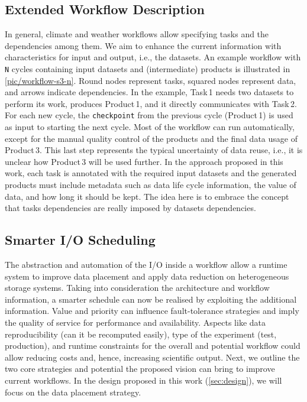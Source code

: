 \documentclass{superfri}
\begin{document}
\subsection{Extended Workflow Description}

In general, climate and weather workflows allow specifying tasks and the dependencies among them.
We aim to enhance the current information with characteristics for input and output, i.e., the datasets.
An example workflow with \texttt{N} cycles containing input datasets and (intermediate) products is illustrated in \cref{pic/workflow-s3-n}.
Round nodes represent tasks, squared nodes represent data, and arrows indicate dependencies.
In the example, Task\,1 needs two datasets to perform its work, produces Product\,1, and it directly communicates with Task\,2.
For each new cycle, the \texttt{checkpoint} from the previous cycle (Product\,1) is used as input to starting the next cycle.
Most of the workflow can run automatically, except for the manual quality control of the products and the final data usage of Product\,3.
This last step represents the typical uncertainty of data reuse, i.e., it is unclear how Product\,3 will be used further.
In the approach proposed in this work, each task is annotated with the required input datasets and the generated products must include metadata such as data life cycle information, the value of data, and how long it should be kept.
The idea here is to embrace the concept that tasks dependencies are really imposed by datasets dependencies.


\subsection{Smarter I/O Scheduling}

The abstraction and automation of the I/O inside a workflow allow a runtime system to improve data placement and apply data reduction on heterogeneous storage systems.
Taking into consideration the architecture and workflow information, a smarter schedule can now be realised by exploiting the additional information.
Value and priority can influence fault-tolerance strategies and imply the quality of service for performance and availability.
Aspects like data reproducibility (can it be recomputed easily), type of the experiment (test, production), and runtime constraints for the overall and potential workflow could allow reducing costs and, hence, increasing scientific output.
Next, we outline the two core strategies and potential the proposed vision can bring to improve current workflows.
In the design proposed in this work (\cref{sec:design}), we will focus on the data placement strategy.
\end{document}
